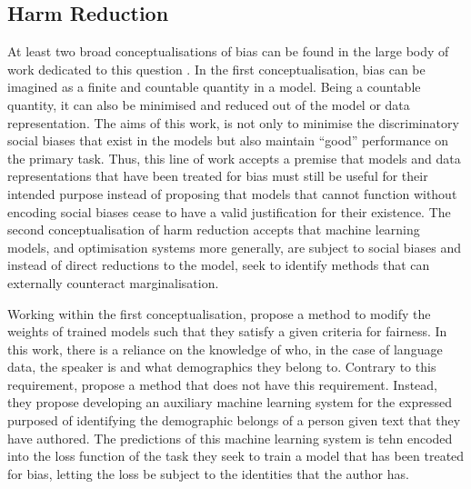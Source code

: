 \subsection{Harm Reduction}
At least two broad conceptualisations of bias can be found in the large body of work dedicated to this question \citep[e.g.][]{Agarwal:2018,Romanov:2019,Kulynych:2020,Bolukbasi:2016,Zhao:2017}.
In the first conceptualisation, bias can be imagined as a finite and countable quantity in a model. Being a countable quantity, it can also be minimised and reduced out of the model or data representation.
The aims of this work, is not only to minimise the discriminatory social biases that exist in the models but also maintain ``good'' performance on the primary task.
Thus, this line of work accepts a premise that models and data representations that have been treated for bias must still be useful for their intended purpose instead of proposing that models that cannot function without encoding social biases cease to have a valid justification for their existence.
The second conceptualisation of harm reduction accepts that machine learning models, and optimisation systems more generally, are subject to social biases and instead of direct reductions to the model, seek to identify methods that can externally counteract marginalisation.

Working within the first conceptualisation, \citet{Agarwal:2018} propose a method to modify the weights of trained models such that they satisfy a given criteria for fairness. In this work, there is a reliance on the knowledge of who, in the case of language data, the speaker is and what demographics they belong to.
Contrary to this requirement, \citet{Romanov:2019} propose a method that does not have this requirement. Instead, they propose developing an auxiliary machine learning system for the expressed purposed of identifying the demographic belongs of a person given text that they have authored. The predictions of this machine learning system is tehn encoded into the loss function of the task they seek to train a model that has been treated for bias, letting the loss be subject to the identities that the author has.

